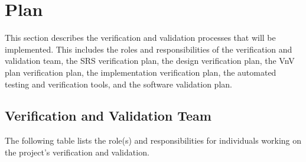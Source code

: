 \documentclass[12pt, titlepage]{article}
\renewcommand{\wss}[1]{}
\begin{document}
\wss{Don't just list the other documents.  You should explain why they are relevant and 
how they relate to your VnV efforts.}

\section{Plan}

\wss{Introduce this section.  You can provide a roadmap of the sections to
  come.}

This section describes the verification and validation processes that will be implemented. This includes the roles and responsibilities of the verification and validation team, the SRS verification plan, the design verification plan, the VnV plan verification plan, the implementation verification plan, the automated testing and verification tools, and the software validation plan.

\subsection{Verification and Validation Team}

\wss{Your teammates.  Maybe your supervisor.
  You should do more than list names.  You should say what each person's role is
  for the project's verification.  A table is a good way to summarize this information.}

The following table lists the role(s) and responsibilities for individuals working on the project's verification and validation.
\end{document}
